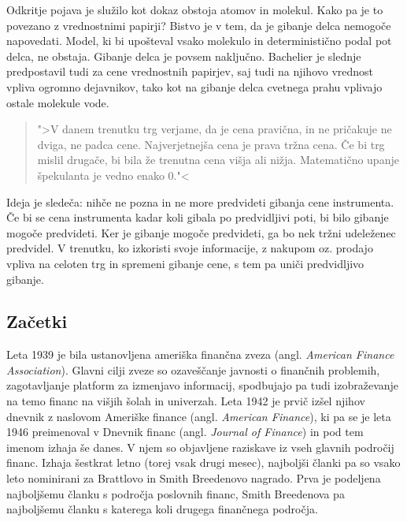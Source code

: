 \documentclass[12pt,a4paper]{amsart}
\theoremstyle{definition} %
\theoremstyle{plain} %
\begin{document}
Odkritje pojava je služilo kot dokaz obstoja atomov in molekul. Kako pa je to povezano z vrednostnimi
papirji? Bistvo je v tem, da je gibanje delca nemogoče napovedati. Model, ki bi upošteval vsako 
molekulo in deterministično podal pot delca, ne obstaja. Gibanje delca je povsem naključno. 
Bachelier je slednje predpostavil tudi za cene vrednostnih papirjev, saj tudi na njihovo vrednost
vpliva ogromno dejavnikov, tako kot na gibanje delca cvetnega prahu vplivajo ostale molekule 
vode.


\begin{quotation}
   	">V danem trenutku trg verjame, da je cena pravična, in ne pričakuje ne dviga, ne padca cene.
	Najverjetnejša cena je prava tržna cena. Če bi trg mislil drugače, bi bila že trenutna cena višja ali
	nižja. Matematično upanje špekulanta je vedno enako $0$."<
\end{quotation}

Ideja je sledeča: nihče
ne pozna in ne more predvideti gibanja cene instrumenta. Če bi se cena instrumenta kadar koli 
gibala po predvidljivi poti, bi bilo gibanje mogoče predvideti. Ker je gibanje mogoče predvideti, ga
bo nek tržni udeleženec predvidel. V trenutku, ko izkoristi svoje informacije, z nakupom oz. prodajo
vpliva na celoten trg in spremeni gibanje cene, s tem pa uniči predvidljivo gibanje.


\subsection{Začetki}
Leta 1939 je bila ustanovljena ameriška finančna zveza (angl. \textit{American Finance Association}).
Glavni cilji zveze so ozaveščanje javnosti o finančnih problemih, zagotavljanje platform za izmenjavo 
informacij, spodbujajo pa tudi izobraževanje na temo financ na višjih šolah in univerzah. Leta
1942 je prvič izšel njihov dnevnik z naslovom Ameriške finance (angl. \textit{American Finance}),
ki pa se je leta 1946 preimenoval v Dnevnik financ (angl. \textit{Journal of Finance}) in pod
tem imenom izhaja še danes. V njem so objavljene raziskave iz vseh glavnih področij financ.
Izhaja šestkrat letno (torej vsak drugi mesec), najboljši članki pa so vsako leto nominirani za 
Brattlovo in Smith Breedenovo nagrado. Prva je podeljena najboljšemu članku s področja 
poslovnih financ, Smith Breedenova pa najboljšemu članku s katerega koli drugega finančnega
področja.
\end{document}
